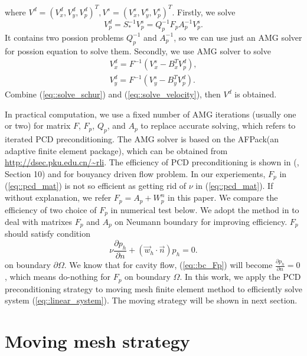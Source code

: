 \documentclass{eajam}
\begin{document}
  where $V^d = (V_x^d, V_y^d, V_p^d)^T, V^s = (V_x^s, V_y^s, V_p^s)^T$.
  Firstly, we solve 
  \begin{equation}
    V_p^d = S_*^{-1} V_p^s = Q_p^{-1} F_p A_p^{-1} V_p^s.
    \label{eq::solve_schur}
  \end{equation}
  It contains two possion problems $Q_p^{-1}$ and $A_p^{-1}$, so we can
  use just an AMG solver for possion equation to solve them.
  Secondly, we use AMG solver to solve 
  \begin{equation}
    \begin{aligned}
      V_x^d = F^{-1} (V_x^s - B_x^T V_p^d), \\
      V_y^d = F^{-1} (V_y^s - B_y^T V_p^d).
    \end{aligned}
    \label{eq::solve_velocity}
  \end{equation}
  Combine (\ref{eq::solve_schur}) and (\ref{eq::solve_velocity}), then
  $V^d$ is obtained.

  In practical computation, we use a fixed number of AMG iterations
  (usually one or two) for matrix $F$, $F_p$, $Q_p$, and $A_p$ to
  replace accurate solving, which refers to iterated PCD
  preconditioning. The AMG solver is based on the AFPack(an adaptive
  finite element package), which can be
  obtained from \url{http://dsec.pku.edu.cn/~rli}. The efficiency of
  PCD preconditioning is shown in (\cite{elman2005finite},
  Section 10) and \cite{elman2011fast} for bouyancy driven flow
  problem. In our experiements, $F_p$ in (\ref{eq::pcd_mat}) is not so
  efficient as getting rid of $\nu$ in (\ref{eq::pcd_mat}). If without
  explanation, we refer $F_p = A_p + W_p^n$ in this paper. We compare
  the efficiency of two choice of $F_p$ in numerical test below. We
  adopt the method in \cite{elman2009boundary} to deal with matrixes
  $F_p$ and $A_p$ on Neumann boundary for improving efficiency. $F_p$
  should satisfy condition
  \begin{equation}
    \nu \frac{\partial p_h}{\partial n} + (\vec{w}_h \cdot \vec{n})
    p_h = 0.
    \label{eq::bc_Fp}
  \end{equation}
  on boundary $\partial \Omega$. We know that for cavity flow,
  (\ref{eq::bc_Fp}) will become $\frac{\partial p_h}{\partial n} =
  0$, which means do-nothing for $F_p$ on boundary $\Omega$. 
  In this work, we apply the PCD preconditioning strategy to moving mesh
  finite element method to efficiently solve system
  (\ref{eq::linear_system}). The moving strategy will be shown in next
  section.
 
\section{Moving mesh strategy}
\end{document}
